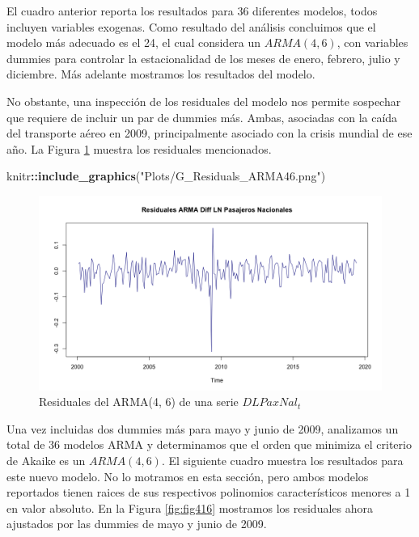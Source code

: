 \documentclass[
]{book}
\newenvironment{Shaded}{\begin{snugshade}}{\end{snugshade}}
\newcommand{\FunctionTok}[1]{\textcolor[rgb]{0.13,0.29,0.53}{\textbf{#1}}}
\newcommand{\NormalTok}[1]{#1}
\newcommand{\SpecialCharTok}[1]{\textcolor[rgb]{0.81,0.36,0.00}{\textbf{#1}}}
\newcommand{\StringTok}[1]{\textcolor[rgb]{0.31,0.60,0.02}{#1}}
\begin{document}
El cuadro anterior reporta los resultados para 36 diferentes modelos, todos incluyen variables exogenas. Como resultado del análisis concluimos que el modelo más adecuado es el 24, el cual considera un \(ARMA(4, 6)\), con variables dummies para controlar la estacionalidad de los meses de enero, febrero, julio y diciembre. Más adelante mostramos los resultados del modelo.

No obstante, una inspección de los residuales del modelo nos permite sospechar que requiere de incluir un par de dummies más. Ambas, asociadas con la caída del transporte aéreo en 2009, principalmente asociado con la crisis mundial de ese año. La Figura \ref{fig:fig415} muestra los residuales mencionados.

\begin{Shaded}
\begin{Highlighting}[]
\NormalTok{knitr}\SpecialCharTok{::}\FunctionTok{include\_graphics}\NormalTok{(}\StringTok{"Plots/G\_Residuals\_ARMA46.png"}\NormalTok{) }
\end{Highlighting}
\end{Shaded}

\begin{figure}

{\centering \includegraphics[width=0.95\linewidth]{Plots/G_Residuals_ARMA46} 

}

\caption{Residuales del ARMA(4, 6) de una serie $DLPaxNal_t$}\label{fig:fig415}
\end{figure}

Una vez incluidas dos dummies más para mayo y junio de 2009, analizamos un total de 36 modelos ARMA y determinamos que el orden que minimiza el criterio de Akaike es un \(ARMA(4, 6)\). El siguiente cuadro muestra los resultados para este nuevo modelo. No lo motramos en esta sección, pero ambos modelos reportados tienen raices de sus respectivos polinomios característicos menores a 1 en valor absoluto. En la Figura \ref{fig:fig416} mostramos los residuales ahora ajustados por las dummies de mayo y junio de 2009.
\end{document}

